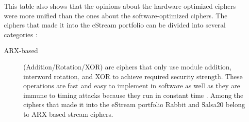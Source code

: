This table also shows that the opinions about the hardware-optimized ciphers were more unified than the ones about the software-optimized ciphers.
The ciphers that made it into the eStream portfolio can be divided into several categories \cite{jiao2020stream}:
\begin{description}
	\item [ARX-based] (Addition/Rotation/XOR) are ciphers that only use module addition, interword rotation, and XOR to achieve required security strength. These operations are fast and easy to implement in software as well as they are immune to timing attacks because they run in constant time \cite{jiao2020stream}.
	Among the ciphers that made it into the eStream portfolio Rabbit and Salsa20 belong to ARX-based stream ciphers.
	\begin{figure}[h]
		

\end{figure}
\end{description}
